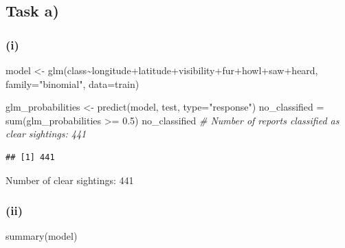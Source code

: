 \documentclass[
]{article}
\newenvironment{Shaded}{\begin{snugshade}}{\end{snugshade}}
\newcommand{\AttributeTok}[1]{\textcolor[rgb]{0.77,0.63,0.00}{#1}}
\newcommand{\CommentTok}[1]{\textcolor[rgb]{0.56,0.35,0.01}{\textit{#1}}}
\newcommand{\FloatTok}[1]{\textcolor[rgb]{0.00,0.00,0.81}{#1}}
\newcommand{\FunctionTok}[1]{\textcolor[rgb]{0.00,0.00,0.00}{#1}}
\newcommand{\NormalTok}[1]{#1}
\newcommand{\OtherTok}[1]{\textcolor[rgb]{0.56,0.35,0.01}{#1}}
\newcommand{\SpecialCharTok}[1]{\textcolor[rgb]{0.00,0.00,0.00}{#1}}
\newcommand{\StringTok}[1]{\textcolor[rgb]{0.31,0.60,0.02}{#1}}
\begin{document}
\hypertarget{task-a}{%
\subsection{Task a)}\label{task-a}}

\hypertarget{i-1}{%
\subsubsection{(i)}\label{i-1}}

\begin{Shaded}
\begin{Highlighting}[]
\NormalTok{model }\OtherTok{\textless{}{-}} \FunctionTok{glm}\NormalTok{(class}\SpecialCharTok{\textasciitilde{}}\NormalTok{longitude}\SpecialCharTok{+}\NormalTok{latitude}\SpecialCharTok{+}\NormalTok{visibility}\SpecialCharTok{+}\NormalTok{fur}\SpecialCharTok{+}\NormalTok{howl}\SpecialCharTok{+}\NormalTok{saw}\SpecialCharTok{+}\NormalTok{heard, }\AttributeTok{family=}\StringTok{"binomial"}\NormalTok{, }\AttributeTok{data=}\NormalTok{train)}

\NormalTok{glm\_probabilities }\OtherTok{\textless{}{-}} \FunctionTok{predict}\NormalTok{(model, test, }\AttributeTok{type=}\StringTok{"response"}\NormalTok{)}
\NormalTok{no\_classified }\OtherTok{=} \FunctionTok{sum}\NormalTok{(glm\_probabilities }\SpecialCharTok{\textgreater{}=} \FloatTok{0.5}\NormalTok{)}
\NormalTok{no\_classified }\CommentTok{\# Number of reports classified as clear sightings: 441}
\end{Highlighting}
\end{Shaded}

\begin{verbatim}
## [1] 441
\end{verbatim}

Number of clear sightings: 441

\hypertarget{ii-2}{%
\subsubsection{(ii)}\label{ii-2}}

\begin{Shaded}
\begin{Highlighting}[]
\FunctionTok{summary}\NormalTok{(model)}
\end{Highlighting}
\end{Shaded}
\end{document}
